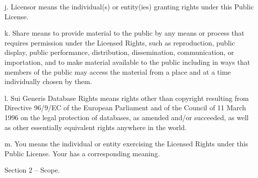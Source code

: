 j. Licensor means the individual(s) or entity(ies) granting rights under this Public License.

k. Share means to provide material to the public by any means or process that requires permission under the Licensed Rights, such as reproduction, public display, public performance, distribution, dissemination, communication, or importation, and to make material available to the public including in ways that members of the public may access the material from a place and at a time individually chosen by them.

l. Sui Generis Database Rights means rights other than copyright resulting from Directive 96/9/\+EC of the European Parliament and of the Council of 11 March 1996 on the legal protection of databases, as amended and/or succeeded, as well as other essentially equivalent rights anywhere in the world.

m. You means the individual or entity exercising the Licensed Rights under this Public License. Your has a corresponding meaning.

Section 2 -- Scope.

